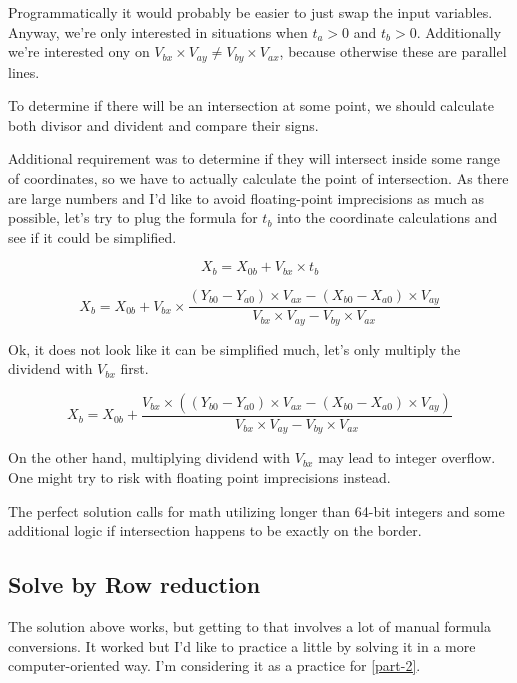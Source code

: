 \documentclass{article}
\begin{document}
Programmatically it would probably be easier to just swap the input variables. Anyway, we're only interested in situations when $t_a > 0$ and $t_b > 0$.
Additionally we're interested ony on $V_{bx} \times V_{ay} \neq V_{by} \times V_{ax}$, because otherwise these are parallel lines.

To determine if there will be an intersection at some point, we should calculate both divisor and divident and compare their signs.

Additional requirement was to determine if they will intersect inside some range of coordinates, so we have to actually calculate the
point of intersection. As there are large numbers and I'd like to avoid floating-point imprecisions as much as possible, let's try to plug the
formula for $t_b$ into the coordinate calculations and see if it could be simplified.



\begin{displaymath}
    X_b = X_{0b} + V_{bx} \times t_b
\end{displaymath}


\begin{displaymath}
    X_b = X_{0b} + V_{bx} \times \frac{(Y_{b0} - Y_{a0}) \times V_{ax} - (X_{b0} - X_{a0}) \times V_{ay}}{V_{bx} \times V_{ay} - V_{by} \times V_{ax}}
\end{displaymath}


Ok, it does not look like it can be simplified much, let's only multiply the dividend with $V_{bx}$ first.

\begin{displaymath}
    X_b = X_{0b} + \frac{V_{bx} \times ((Y_{b0} - Y_{a0}) \times V_{ax} - (X_{b0} - X_{a0}) \times V_{ay})}{V_{bx} \times V_{ay} - V_{by} \times V_{ax}}
\end{displaymath}

On the other hand, multiplying dividend with $V_{bx}$ may lead to integer overflow. One might try to risk with floating point imprecisions instead.

The perfect solution calls for math utilizing longer than 64-bit integers and some additional logic if intersection happens to be exactly on
the border.


\subsection{Solve by Row reduction}

The solution above works, but getting to that involves a lot of manual formula conversions. It worked but I'd like to practice a little
by solving it in a more computer-oriented way. I'm considering it as a practice for \ref{part-2}.
\end{document}
